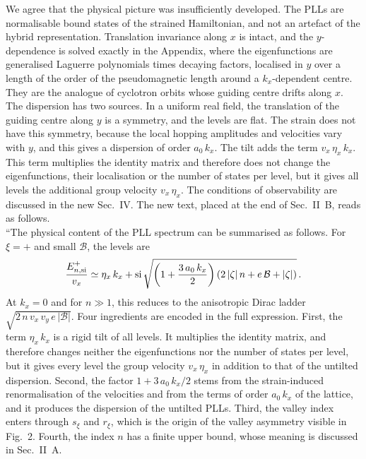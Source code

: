 \documentclass[aps,prb,onecolumn,nofootinbib,citeautoscript,10pt]{revtex4-2}
\begin{document}
\begin{enumerate}
We agree that the physical picture was insufficiently developed. The PLLs are normalisable bound states of the strained Hamiltonian, and not an artefact of the hybrid representation. Translation invariance along $x$ is intact, and the $y$-dependence is solved exactly in the Appendix, where the eigenfunctions are generalised Laguerre polynomials times decaying factors, localised in $y$ over a length of the order of the pseudomagnetic length around a $k_x$-dependent centre. They are the analogue of cyclotron orbits whose guiding centre drifts along $x$. The dispersion has two sources. In a uniform real field, the translation of the guiding centre along $y$ is a symmetry, and the levels are flat. The strain does not have this symmetry, because the local hopping amplitudes and velocities vary with $y$, and this gives a dispersion of order $a_0\,k_x$. The tilt adds the term $v_x\,\eta_x\,k_x$. This term multiplies the identity matrix and therefore does not change the eigenfunctions, their localisation or the number of states per level, but it gives all levels the additional group velocity $v_x\,\eta_x$. The conditions of observability are discussed in the new Sec.~IV. The new text, placed at the end of Sec.~II~B, reads as follows.\\``The physical content of the PLL spectrum can be summarised as follows. For $\xi=+$ and small $\mathcal B$, the levels are
\begin{align}
\frac{E^{+}_{n,\rm si}}{v_x}\simeq\eta_x\,k_x+{\rm si}\,\sqrt{\left(1+\frac{3\,a_0\,k_x}{2}\right)\left(2\,|\zeta|\,n+e\,\mathcal B+|\zeta|\right)}\,.
\end{align}
At $k_x=0$ and for $n\gg1$, this reduces to the anisotropic Dirac ladder $\sqrt{2\,n\,v_x\,v_y\,e\,|\mathcal B|}$. Four ingredients are encoded in the full expression. First, the term $\eta_x\,k_x$ is a rigid tilt of all levels. It multiplies the identity matrix, and therefore changes neither the eigenfunctions nor the number of states per level, but it gives every level the group velocity $v_x\,\eta_x$ in addition to that of the untilted dispersion. Second, the factor $1+3\,a_0\,k_x/2$ stems from the strain-induced renormalisation of the velocities and from the terms of order $a_0\,k_x$ of the lattice, and it produces the dispersion of the untilted PLLs. Third, the valley index enters through $s_\xi$ and $r_\xi$, which is the origin of the valley asymmetry visible in Fig.~2. Fourth, the index $n$ has a finite upper bound, whose meaning is discussed in Sec.~II~A.


\end{enumerate}
\end{document}
